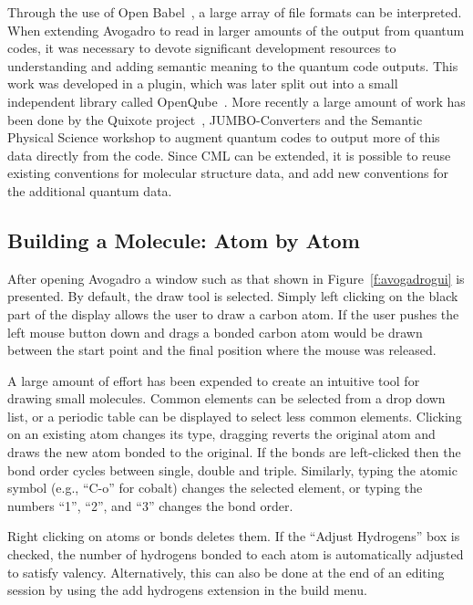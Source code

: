 \documentclass[10pt]{bmc_article}
\newenvironment{bmcformat}{\begin{raggedright}
\baselineskip20pt\sloppy\setboolean{publ}{false}}{\end{raggedright}
\baselineskip20pt\sloppy}
\begin{document}
\begin{bmcformat}
Through the use of Open Babel~\cite{OpenBabel}, a large array of file
formats can be interpreted. When extending Avogadro to read in larger
amounts of the output from quantum codes, it was necessary to devote
significant development resources to understanding and adding semantic
meaning to the quantum code outputs. This work was developed in a plugin, which was later split out into a small independent
library called OpenQube~\cite{OpenQube}. More recently a large amount of work has been done
by the Quixote project~\cite{Quixote}, JUMBO-Converters and the Semantic
Physical Science workshop to augment quantum codes to output more of this data
directly from the code. Since CML can be extended, it is possible to reuse
existing conventions for molecular structure data, and add new
conventions for the additional quantum data.

\subsection{Building a Molecule: Atom by Atom}

After opening Avogadro a window such as that shown in Figure~\ref{f:avogadrogui}
is presented. By default, the draw tool is selected. Simply left clicking on the
black part of the display
allows the user to draw a carbon atom. If the user pushes the left
mouse button down and drags a bonded carbon atom would be drawn
between the start point and the final position where the mouse was released.

A large amount of effort has been expended to create an intuitive tool for
drawing small molecules. Common elements can be selected from a drop down list,
or a periodic table can be displayed to select less common elements. Clicking on
an existing atom changes its type, dragging reverts the original atom and draws
the new atom bonded to the original. If the bonds are left-clicked then the bond
order cycles between single, double and triple. Similarly, typing the
atomic symbol (e.g., ``C-o'' for cobalt) changes the selected element,
or typing the numbers ``1'', ``2'', and ``3'' changes the bond order.

Right clicking on atoms or bonds deletes them. If the ``Adjust Hydrogens'' box
is checked, the number of hydrogens bonded to each atom is automatically
adjusted to satisfy valency. Alternatively, this can also be done at the end of
an editing session by using the add hydrogens extension in the build menu.


\end{bmcformat}
\end{document}
